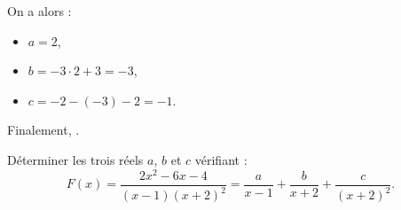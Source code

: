 \begin{ex}
\begin{valiny}
                              On a alors :
                              \begin{itemize}
                                    \item $a = 2$,
                                    \item $b = -3 \cdot 2 + 3 = -3$,
                                    \item $c = -2 - (-3) -2 = -1$.
                              \end{itemize}
                              Finalement, .
                        \end{valiny}
                  \end{ex}
                  \begin{ex}
                        D\'eterminer les trois r\'eels $a$, $b$ et $c$ v\'erifiant :
                        \[
                              F(x) = 
                              \frac{2 x^2 - 6 x - 4}{(x-1) (x+2)^2}
                              = 
                              \frac{a}{x-1} +\frac{b}{x+2} + \frac{c}{(x+2)^2}
                              .
                        \]
                  \end{ex}
